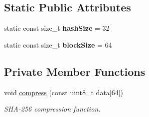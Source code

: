 \subsection*{Static Public Attributes}
\begin{DoxyCompactItemize}
\item 
\hypertarget{classSHA256_a092a610392dab8ef06a4e74a9f60717c}{}static const size\+\_\+t {\bfseries hash\+Size} = 32\label{classSHA256_a092a610392dab8ef06a4e74a9f60717c}

\item 
\hypertarget{classSHA256_a15b5cd20a4b15510826d9187fb93bc16}{}static const size\+\_\+t {\bfseries block\+Size} = 64\label{classSHA256_a15b5cd20a4b15510826d9187fb93bc16}

\end{DoxyCompactItemize}
\subsection*{Private Member Functions}
\begin{DoxyCompactItemize}
\item 
\hypertarget{classSHA256_a18c0dd9fd3be798a4cb98192a8c83c82}{}void \hyperlink{classSHA256_a18c0dd9fd3be798a4cb98192a8c83c82}{compress} (const uint8\+\_\+t data\mbox{[}64\mbox{]})\label{classSHA256_a18c0dd9fd3be798a4cb98192a8c83c82}

\begin{DoxyCompactList}\small\item\em S\+H\+A-\/256 compression function. \end{DoxyCompactList}\end{DoxyCompactItemize}
